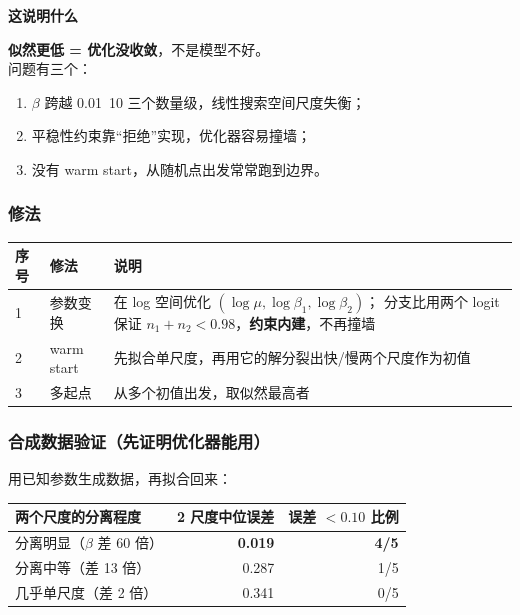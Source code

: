 \documentclass[UTF8,a4paper,11pt]{ctexart}
\newenvironment{explainbox}[1]
{\begin{center}\begin{minipage}{0.94\textwidth}\colorbox{boxbg}{\parbox{0.92\textwidth}{\textbf{#1}\par\vspace{2pt}}}}
{\end{minipage}\end{center}}
\newcommand{\hl}[1]{\textcolor{blue!70!black}{\textbf{#1}}}
\begin{document}
\begin{explainbox}{这说明什么}
\textbf{似然更低 = 优化没收敛}，不是模型不好。\\
问题有三个：
\begin{enumerate}[leftmargin=1.4em,itemsep=1pt]
\item $\beta$ 跨越 0.01~10 三个数量级，线性搜索空间尺度失衡；
\item 平稳性约束靠“拒绝”实现，优化器容易撞墙；
\item 没有 warm start，从随机点出发常常跑到边界。
\end{enumerate}
\end{explainbox}

\subsubsection{修法}

\begin{longtable}{@{}p{0.8cm}p{4.0cm}p{9.0cm}@{}}
\toprule
\textbf{序号} & \textbf{修法} & \textbf{说明} \\
\midrule
1 & 参数变换 & 在 log 空间优化 $(\log\mu, \log\beta_1, \log\beta_2)$；
分支比用两个 logit 保证 $n_1+n_2<0.98$，\textbf{约束内建}，不再撞墙 \\
2 & warm start & 先拟合单尺度，再用它的解分裂出快/慢两个尺度作为初值 \\
3 & 多起点 & 从多个初值出发，取似然最高者 \\
\bottomrule
\end{longtable}

\subsubsection{合成数据验证（先证明优化器能用）}

用已知参数生成数据，再拟合回来：

\begin{center}
\begin{tabular}{p{4.2cm}rr}
\toprule
\textbf{两个尺度的分离程度} & \textbf{2 尺度中位误差} & \textbf{误差 $<0.10$ 比例} \\
\midrule
分离明显（$\beta$ 差 60 倍） & \hl{0.019} & \hl{4/5} \\
分离中等（差 13 倍） & 0.287 & 1/5 \\
几乎单尺度（差 2 倍） & 0.341 & 0/5 \\
\bottomrule
\end{tabular}
\end{center}
\end{document}
